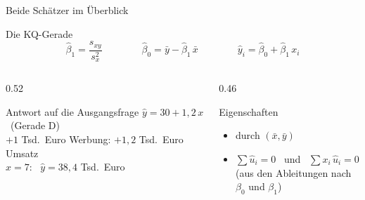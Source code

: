 \documentclass[aspectratio=169,11pt]{beamer}
\begin{document}
\begin{frame}{Beide Schätzer im Überblick}
  \begin{block}{Die KQ-Gerade}
    \vspace{-4pt}
    \[
      \hat{\beta}_1 = \frac{s_{xy}}{s_x^{2}}
      \qquad\qquad
      \hat{\beta}_0 = \bar{y} - \hat{\beta}_1\,\bar{x}
      \qquad\qquad
      \hat{y}_i = \hat{\beta}_0 + \hat{\beta}_1\, x_i
    \]
    \vspace{-10pt}
  \end{block}

  \medskip

  \begin{columns}[T]
    \begin{column}{0.52\textwidth}
      \begin{exampleblock}{Antwort auf die Ausgangsfrage}
        $\hat{y} = 30 + 1{,}2\,x$ \ (Gerade D)\\[2pt]
        $+1$ Tsd.~Euro Werbung: $+1{,}2$ Tsd.~Euro Umsatz\\
        $x = 7$: \ $\hat{y} = 38{,}4$ Tsd.~Euro
      \end{exampleblock}
    \end{column}
    \begin{column}{0.46\textwidth}
      \begin{block}{Eigenschaften}
        \begin{itemize}
          \item durch $(\bar{x}, \bar{y})$
          \item $\sum \hat{u}_i = 0$ \ und \ $\sum x_i\,\hat{u}_i = 0$\\
                {\footnotesize (aus den Ableitungen nach $\beta_0$ und $\beta_1$)}
        \end{itemize}
      \end{block}
    \end{column}
  \end{columns}
  \hfill\hyperlink{herleitung}{}
\end{frame}
\end{document}
